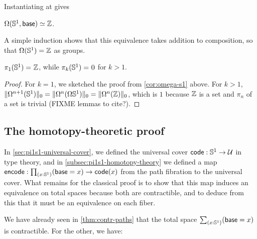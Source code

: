 Instantiating at {\base} gives
\begin{cor}\label{cor:omega-s1}
$\eqv {\Omega(\Sn^1,\base)} {\Z}$.
\end{cor}

A simple induction shows that this equivalence takes addition to
composition, so that $\Omega(\Sn ^1) = \Z$ as groups.

\begin{cor}
$\id{\pi_1(\Sn ^1)} {\Z}$, while $\id{\pi_k(\Sn ^1)}0$ for $k>1$.
\end{cor}
\begin{proof}
For $k=1$, we sketched the proof from \autoref{cor:omega-s1} above.
For $k > 1$, $\trunc 0 {\Omega^{n+1}(\Sn ^1)} = \trunc 0
{\Omega^n(\Omega{\Sn ^1})} = \trunc 0 {\Omega^n(\Z)}$, which is
  $1$ because $\Z$ is a set and $\pi_n$ of a set is trivial (FIXME
  lemmas to cite?).
\end{proof}


\subsection{The homotopy-theoretic proof}
\label{subsec:pi1s1-homotopy-theory}

In \autoref{sec:pi1s1-universal-cover}, we defined the universal cover $\code:\Sn^1\to\type$ in type theory, and in \autoref{subsec:pi1s1-homotopy-theory} we defined a map $\encode : \prd{x:\Sn^1} (\base=x) \to \code(x)$ from the path fibration to the universal cover.
What remains for the classical proof is to show that this map induces an equivalence on total spaces because both are contractible, and to deduce from this that it must be an equivalence on each fiber.

We have already seen in \autoref{thm:contr-paths} that the total space $\sm{x:\Sn^1} (\base=x)$ is contractible.
For the other, we have:

